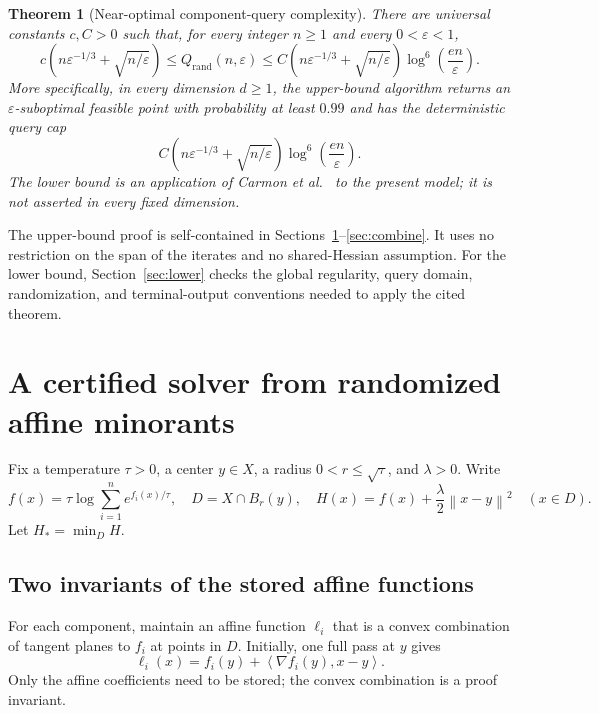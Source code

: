 \documentclass[11pt,a4paper]{article}
\newtheorem{theorem}{Theorem}[section]
\theoremstyle{definition}\newtheorem{definition}[theorem]{Definition}
\theoremstyle{remark}\newtheorem{remark}[theorem]{Remark}
\newcommand{\eps}{\varepsilon}
\newcommand{\norm}[1]{\left\|#1\right\|}
\newcommand{\ip}[2]{\left\langle#1,#2\right\rangle}
\newcommand{\Q}{Q_{\mathrm{rand}}}
\begin{document}
\begin{theorem}[Near-optimal component-query complexity]\label{thm:main}
There are universal constants $c,C>0$ such that, for every integer $n\ge1$
and every $0<\eps<1$,
\begin{equation}\label{eq:matching}
 c\left(n\eps^{-1/3}+\sqrt{n/\eps}\right)
 \le \Q(n,\eps)
 \le C\left(n\eps^{-1/3}+\sqrt{n/\eps}\right)
       \log^6\!\left(\frac{en}{\eps}\right).
\end{equation}
More specifically, in every dimension $d\ge1$, the upper-bound algorithm
returns an $\eps$-suboptimal feasible point with probability at least
$0.99$ and has the deterministic query cap
\begin{equation}\label{eq:upper}
 C\left(n\eps^{-1/3}+\sqrt{n/\eps}\right)
       \log^6\!\left(\frac{en}{\eps}\right).
\end{equation}
The lower bound is an application of Carmon et al.~\cite[Theorem~10]{inside}
to the present model; it is not asserted in every fixed dimension.
\end{theorem}

The upper-bound proof is self-contained in
Sections~\ref{sec:local}--\ref{sec:combine}. It uses no restriction on the
span of the iterates and no shared-Hessian assumption. For the lower bound,
Section~\ref{sec:lower} checks the global regularity, query domain,
randomization, and terminal-output conventions needed to apply the cited
theorem.

\section{A certified solver from randomized affine minorants}\label{sec:local}
Fix a temperature $\tau>0$, a center $y\in X$, a radius $0<r\le\sqrt\tau$, and $\lambda>0$. Write
\begin{equation}\label{eq:soft}
 f(x)=\tau\log\sum_{i=1}^n e^{f_i(x)/\tau},\quad
 D=X\cap B_r(y),\quad
 H(x)=f(x)+\frac\lambda2\norm{x-y}^2\quad(x\in D).
\end{equation}
Let $H_* =\min_D H$.

\subsection{Two invariants of the stored affine functions}
For each component, maintain an affine function $\ell_i$ that is a convex combination of tangent planes to $f_i$ at points in $D$. Initially, one full pass at $y$ gives
\[
 \ell_i(x)=f_i(y)+\ip{\nabla f_i(y)}{x-y}.
\]
Only the affine coefficients need to be stored; the convex combination is a proof invariant.
\end{document}
